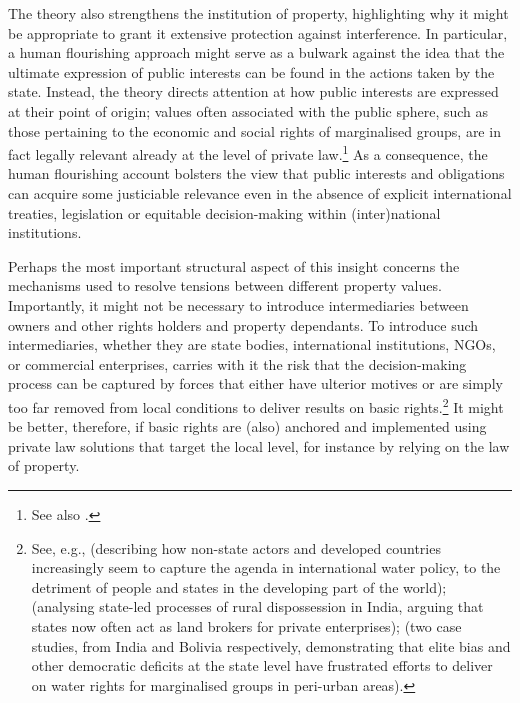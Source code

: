 The theory also strengthens the institution of property, highlighting why it might be appropriate to 
grant it extensive protection against interference. In particular, a human flourishing approach might serve as a bulwark against the idea that the ultimate expression of public interests can be found in the actions taken by the state. Instead, the theory directs attention at how public interests are expressed at their point of origin; values often associated with the public sphere, such as those pertaining to the economic and social rights of marginalised groups, are in fact legally relevant already at the level of private law.\footnote{See also \cite[1295-1296]{alexander14}.} As a consequence, the human flourishing account bolsters the view that public interests and obligations can acquire some justiciable relevance even in the absence of explicit international treaties, legislation or equitable decision-making within (inter)national institutions. 

Perhaps the most important structural aspect of this insight concerns the mechanisms used to resolve tensions between different property values. Importantly, it might not be necessary to introduce intermediaries between owners and other rights holders and property dependants. To introduce such intermediaries, whether they are state bodies, international institutions, NGOs, or commercial enterprises, carries with it the risk that the decision-making process can be captured by forces that either have ulterior motives or are simply too far removed from local conditions to deliver results on basic rights.\footnote{See, e.g., \cite{cullet13} (describing how non-state actors and developed countries increasingly seem to capture the agenda in international water policy, to the detriment of people and states in the developing part of the world); \cite{levien13} (analysing state-led processes of rural dispossession in India, arguing that states now often act as land brokers for private enterprises); \cite{mehta14} (two case studies, from India and Bolivia respectively, demonstrating that elite bias and other democratic deficits at the state level have frustrated efforts to deliver on water rights for marginalised groups in peri-urban areas).} It might be better, therefore, if basic rights are (also) anchored and implemented using private law solutions that target the local level, for instance by relying on the law of property.


